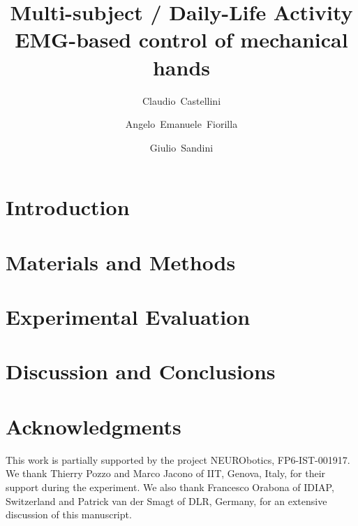 \documentclass[referee]{svjour2}
\begin{document}
\title{Multi-subject / Daily-Life Activity \\ EMG-based control of mechanical hands}

\author{Claudio~Castellini \and Angelo~Emanuele~Fiorilla \and Giulio~Sandini}

\maketitle

\begin{abstract}
  
\end{abstract}


\section{Introduction}
\label{sec:introduction}


\section{Materials and Methods}
\label{sec:m&ms}


\section{Experimental Evaluation}
\label{sec:exp}


\section{Discussion and Conclusions}
\label{sec:discussion}


\section*{Acknowledgments}

This work is partially supported by the project NEURObotics,
FP6-IST-001917. We thank Thierry Pozzo and Marco Jacono of IIT,
Genova, Italy, for their support during the experiment. We also thank
Francesco Orabona of IDIAP, Switzerland and Patrick van der Smagt of
DLR, Germany, for an extensive discussion of this manuscript.

{\small

%

}
\end{document}
